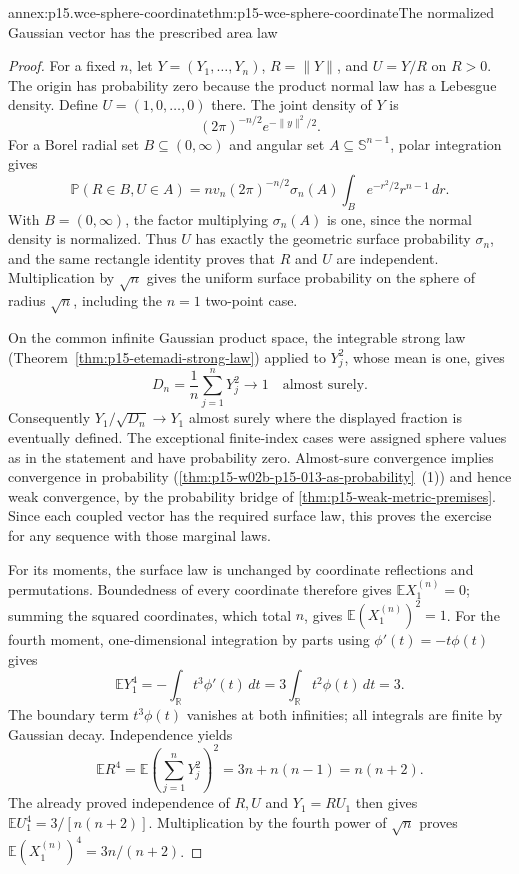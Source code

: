 \begin{annexitem}{annex:p15.wce-sphere-coordinate}{thm:p15-wce-sphere-coordinate}{The normalized Gaussian vector has the prescribed area law}
\begin{proof}
For a fixed \(n\), let \(Y=(Y_1,\ldots,Y_n)\),
\(R=\|Y\|\), and \(U=Y/R\) on \(R>0\).
The origin has probability zero because the product normal law
has a Lebesgue density. Define \(U=(1,0,\ldots,0)\) there.
The joint density of \(Y\) is
\[
 (2\pi)^{-n/2}e^{-\|y\|^2/2}.
 \]
For a Borel radial set \(B\subseteq(0,\infty)\) and
angular set \(A\subseteq\mathbb S^{n-1}\), polar integration gives
\[
 \mathbb P(R\in B,U\in A)
 =n v_n(2\pi)^{-n/2}\sigma_n(A)
                    \int_B e^{-r^2/2}r^{n-1}\,dr.
 \]
With \(B=(0,\infty)\), the factor multiplying \(\sigma_n(A)\)
is one, since the normal density is normalized.
Thus \(U\) has exactly the geometric surface probability
\(\sigma_n\), and the same rectangle identity proves that
\(R\) and \(U\) are independent.
Multiplication by \(\sqrt n\) gives the uniform surface
probability on the sphere of radius \(\sqrt n\), including
the \(n=1\) two-point case.

On the common infinite Gaussian product space, the integrable
strong law (Theorem~\ref{thm:p15-etemadi-strong-law}) applied
to \(Y_j^2\), whose mean is one, gives
\[
 D_n=\frac1n\sum_{j=1}^nY_j^2\longrightarrow1
                                            \quad\text{almost surely}.
 \]
Consequently \(Y_1/\sqrt{D_n}\to Y_1\) almost surely
where the displayed fraction is eventually defined.
The exceptional finite-index cases were assigned sphere values
as in the statement and have probability zero.
Almost-sure convergence implies convergence in probability
(\cref{thm:p15-w02b-p15-013-as-probability}~(1))
and hence weak convergence, by the probability bridge of
\cref{thm:p15-weak-metric-premises}.
Since each coupled vector has the required surface law, this
proves the exercise for any sequence with those marginal laws.

For its moments, the surface law is unchanged by coordinate
reflections and permutations. Boundedness of every coordinate
therefore gives \(\mathbb EX^{(n)}_1=0\); summing the
squared coordinates, which total \(n\), gives
\(\mathbb E(X^{(n)}_1)^2=1\).
For the fourth moment, one-dimensional integration by parts
using \(\phi'(t)=-t\phi(t)\) gives
\[
 \mathbb EY_1^4=-\int_{\mathbb R}t^3\phi'(t)\,dt
       =3\int_{\mathbb R}t^2\phi(t)\,dt=3.
 \]
The boundary term \(t^3\phi(t)\) vanishes at both infinities;
all integrals are finite by Gaussian decay.
Independence yields
\[
 \mathbb ER^4
 =\mathbb E\left(\sum_{j=1}^nY_j^2\right)^2
 =3n+n(n-1)=n(n+2).
 \]
The already proved independence of \(R,U\) and \(Y_1=R U_1\)
then gives
\(\mathbb EU_1^4=3/[n(n+2)]\).
Multiplication by the fourth power of \(\sqrt n\) proves
\(\mathbb E(X^{(n)}_1)^4=3n/(n+2)\).
\end{proof}
\end{annexitem}

